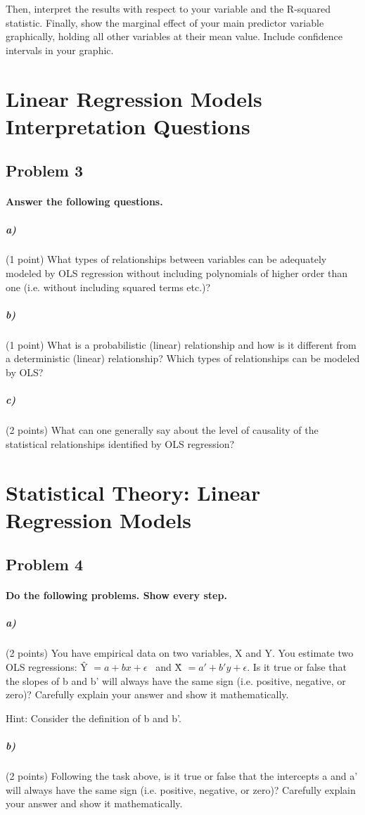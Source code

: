 \documentclass[12pt]{article}
\begin{document}
Then, interpret the results with respect to your variable and the R-squared statistic. Finally, show the marginal effect of your main predictor variable graphically, holding all other variables at their mean value. Include confidence intervals in your graphic.



\pagebreak

\section*{Linear Regression Models Interpretation Questions}

\subsection*{Problem 3}

\paragraph{Answer the following questions.}

\subparagraph{a)} (1 point) What types of relationships between variables can be adequately modeled by OLS regression without including polynomials of higher order than one (i.e. without including squared terms etc.)?

\subparagraph{b)} (1 point) What is a probabilistic (linear) relationship and how is it different from a deterministic (linear) relationship? Which types of relationships can be modeled by OLS?

\subparagraph{c)} (2 points) What can one generally say about the level of causality of the statistical relationships identified by OLS regression?



\section*{Statistical Theory: Linear Regression Models}

\subsection*{Problem 4}

\paragraph{Do the following problems. Show every step.}

\subparagraph{a)} (2 points) You have empirical data on two variables, X and Y. You estimate two OLS regressions: \^{Y} $= a + bx + \epsilon$ \ and \^{X} $= a' + b'y + \epsilon$. Is it true or false that the slopes of b and b' will always have the same sign (i.e. positive, negative, or zero)? Carefully explain your answer and show it mathematically.

Hint: Consider the definition of b and b'.

\subparagraph{b)} (2 points) Following the task above, is it true or false that the intercepts a and a' will always have the same sign (i.e. positive, negative, or zero)? Carefully explain your answer and show it mathematically.
\end{document}
